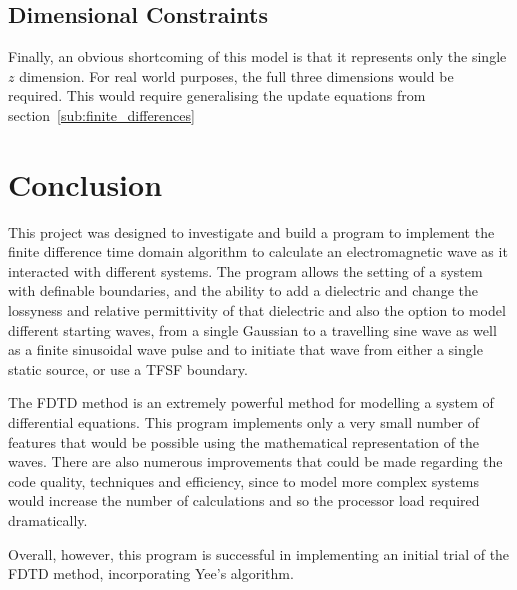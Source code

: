 \subsection{Dimensional Constraints} %
\label{sub:dimensional_constraints}
Finally, an obvious shortcoming of this model is that it represents only the single $z$ dimension. For real world purposes, the full three dimensions would be required. This would require generalising the update equations from section~\ref{sub:finite_differences}

\section{Conclusion} %
\label{sec:conclusion}
This project was designed to investigate and build a program to implement the finite difference time domain algorithm to calculate an electromagnetic wave as it interacted with different systems. The program allows the setting of a system with definable boundaries, and the ability to add a dielectric and change the lossyness and relative permittivity of that dielectric and also the option to model different starting waves, from a single Gaussian to a travelling sine wave as well as a finite sinusoidal wave pulse and to initiate that wave from either a single static source, or use a TFSF boundary.

The FDTD method is an extremely powerful method for modelling a system of differential equations. This program implements only a very small number of features that would be possible using the mathematical representation of the waves. There are also numerous improvements that could be made regarding the code quality, techniques and efficiency, since to model more complex systems would increase the number of calculations and so the processor load required dramatically.

Overall, however, this program is successful in implementing an initial trial of the FDTD method, incorporating Yee's algorithm.
